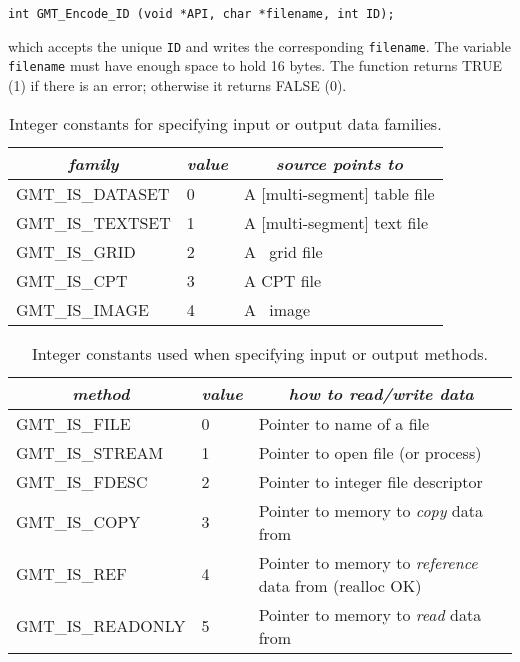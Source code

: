 \documentclass[11pt]{report}
\begin{document}
\begin{verbatim}
int GMT_Encode_ID (void *API, char *filename, int ID);
\end{verbatim}
which accepts the unique \texttt{ID} and writes the corresponding \texttt{filename}.
The variable \texttt{filename} must have enough space to hold 16 bytes.
The function returns TRUE (1) if there is an error; otherwise it returns FALSE (0).

\begin{table}[h]
\small
\centering
\begin{tabular}{|l|l|l|} \hline
\multicolumn{1}{|c|}{\emph{family}} & \multicolumn{1}{c|}{\emph{value}} & \multicolumn{1}{c|}{\emph{source points to}} \\ \hline
GMT\_IS\_DATASET	&	0	&	A [multi-segment] table file \\ \hline
GMT\_IS\_TEXTSET	&	1	&	A [multi-segment] text file \\ \hline
GMT\_IS\_GRID		&	2	&	A \GMT\ grid file \\ \hline
GMT\_IS\_CPT		&	3	&	A CPT file \\ \hline
GMT\_IS\_IMAGE		&	4	&	A \GMT\ image \\ \hline
\end{tabular}
\caption{Integer constants for specifying input or output data families.}
\label{tbl:family}
\end{table}


\begin{table}[h]
\small
\centering
\begin{tabular}{|l|l|l|} \hline
\multicolumn{1}{|c|}{\emph{method}} & \multicolumn{1}{c|}{\emph{value}} & \multicolumn{1}{c|}{\emph{how to read/write data}} \\ \hline
GMT\_IS\_FILE		&	0	&       Pointer to name of a file \\ \hline
GMT\_IS\_STREAM		&	1	&       Pointer to open file (or process)  \\ \hline
GMT\_IS\_FDESC		&	2	&       Pointer to integer file descriptor \\ \hline
GMT\_IS\_COPY		&	3	&       Pointer to memory to \emph{copy} data from \\ \hline
GMT\_IS\_REF		&	4	&       Pointer to memory to \emph{reference} data from (realloc OK) \\ \hline
GMT\_IS\_READONLY	&	5	&       Pointer to memory to \emph{read} data from \\ \hline
\end{tabular}
\caption{Integer constants used when specifying input or output methods.}
\label{tbl:methods}
\end{table}
\end{document}

